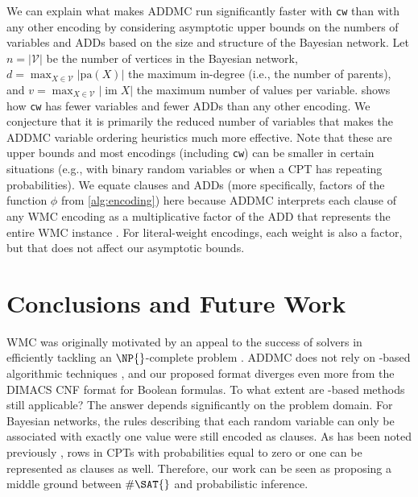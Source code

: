 \documentclass{uai2021} %
\theoremstyle{definition}
\DeclareMathOperator{\im}{im}
\begin{document}
We can explain what makes \textsf{ADDMC} run significantly faster with
\texttt{cw} than with any other encoding by considering asymptotic upper bounds
on the numbers of variables and ADDs based on the size and structure of the
Bayesian network. Let $n = |\mathcal{V}|$ be the number of vertices in the
Bayesian network, $d = \max_{X \in \mathcal{V}} |\mathrm{pa}(X)|$ the maximum
in-degree (i.e., the number of parents), and $v = \max_{X \in \mathcal{V}} |\im
X|$ the maximum number of values per variable.  shows how
\texttt{cw} has fewer variables and fewer ADDs than any other encoding. We
conjecture that it is primarily the reduced number of variables that makes the
\textsf{ADDMC} variable ordering heuristics much more effective. Note that these
are upper bounds and most encodings (including \texttt{cw}) can be smaller in
certain situations (e.g., with binary random variables or when a CPT has
repeating probabilities). We equate clauses and ADDs (more specifically, factors
of the function $\phi$ from \cref{alg:encoding}) here because \textsf{ADDMC}
interprets each clause of any WMC encoding as a multiplicative factor of the ADD
that represents the entire WMC instance \citep{DBLP:conf/aaai/DudekPV20}. For
literal-weight encodings, each weight is also a factor, but that does not affect
our asymptotic bounds.

\section{Conclusions and Future Work}

WMC was originally motivated by an appeal to the success of \SAT{} solvers in
efficiently tackling an $\NP{}$-complete problem
\citep{DBLP:conf/aaai/SangBK05}. \textsf{ADDMC} does not rely on \SAT{}-based
algorithmic techniques \citep{DBLP:conf/aaai/DudekPV20}, and our proposed format
diverges even more from the DIMACS CNF format for Boolean formulas. To what
extent are \SAT{}-based methods still applicable? The answer depends
significantly on the problem domain. For Bayesian networks, the rules describing
that each random variable can only be associated with exactly one value were
still encoded as clauses. As has been noted previously
\citep{DBLP:conf/sat/ChaviraD06}, rows in CPTs with probabilities equal to zero
or one can be represented as clauses as well. Therefore, our work can be seen as
proposing a middle ground between $\#\SAT{}$ and probabilistic inference.
\end{document}
